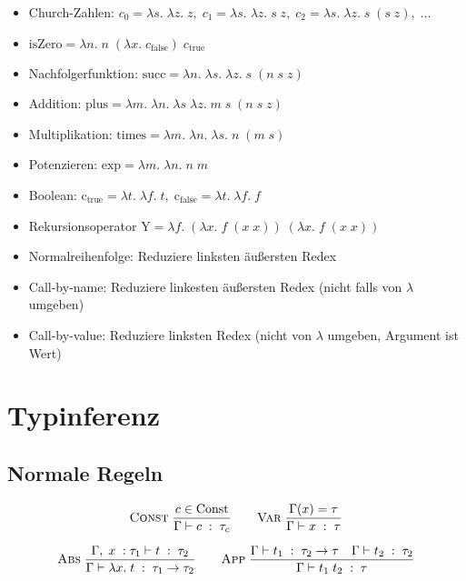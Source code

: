 \documentclass[11pt]{scrartcl}
\begin{document}
\begin{itemize}
    \item Church-Zahlen: \( c_0 = \lambda s. \; \lambda z. \; z, \; 
    c_1 = \lambda s. \; \lambda z. \; s \; z, \; c_2 = \lambda s. \; \lambda z. \; 
    s \; ( s \; z ), \; \dots \)
    \item \( \textrm{isZero} = \lambda n. \; n \; ( \lambda x. \; c_\textrm{false}) \; c_\textrm{true} \)
    \item Nachfolgerfunktion: \( \textrm{succ} = \lambda n. \; \lambda s. \; \lambda z. \; 
    s \; ( n \; s \; z ) \)
    \item Addition: \( \textrm{plus} = \lambda m. \; \lambda n. \; \lambda s \; \lambda z. \; 
    m \; s \; ( n \; s \; z ) \)
    \item Multiplikation: \( \textrm{times} = \lambda m. \; \lambda n. \; \lambda s. \; 
    n \; ( m \; s ) \)
    \item Potenzieren: \( \textrm{exp} = \lambda m. \; \lambda n. \; n \; m \)
    \item Boolean: \( \textrm{c}_\textrm{true} = \lambda t. \; \lambda f. \; t, \; 
    \textrm{c}_\textrm{false} = \lambda t. \; \lambda f. \; f \)
    \item Rekursionsoperator \( \textrm{Y} = \lambda f. \; ( \lambda x. \; f \; ( x \; x ) ) \; ( \lambda x. \; f \; ( x \; x ) ) \)    \item Normalreihenfolge: Reduziere linksten äußersten Redex
    \item Call-by-name: Reduziere linkesten äußersten Redex (nicht falls von \( \lambda \) umgeben)
    \item Call-by-value: Reduziere linksten Redex (nicht von \( \lambda \) umgeben, Argument ist Wert)
\end{itemize}

\section{Typinferenz}

\subsection{Normale Regeln}

\[
    \textsc{Const} \; \dfrac{c \in \textrm{Const}}{\Gamma \vdash c \; : \; \tau_c} \qquad 
    \textsc{Var} \; \dfrac{\Gamma ( x ) = \tau}{\Gamma \vdash x \; : \; \tau}
\]

\[
    \textsc{Abs} \; \dfrac{\Gamma, \; x \; : \tau_1 \vdash t \; : \; \tau_2}{
        \Gamma \vdash \lambda x. \; t \; : \; \tau_1 \rightarrow \tau_2} \qquad 
        \textsc{App} \; \dfrac{\Gamma \vdash t_1 \; : \; \tau_2 \rightarrow \tau \quad 
        \Gamma \vdash t_2 \; : \; \tau_2}{\Gamma \vdash t_1 \; t_2 \; : \; \tau}
\]
\end{document}
